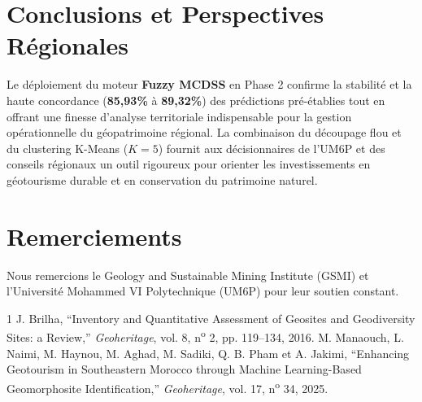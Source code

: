 \documentclass[11pt,twocolumn,a4paper]{article}
\begin{document}
\section{Conclusions et Perspectives Régionales}
Le déploiement du moteur \textbf{Fuzzy MCDSS} en Phase 2 confirme la stabilité et la haute concordance (\textbf{85,93\%} à \textbf{89,32\%}) des prédictions pré-établies tout en offrant une finesse d'analyse territoriale indispensable pour la gestion opérationnelle du géopatrimoine régional. La combinaison du découpage flou et du clustering K-Means ($K=5$) fournit aux décisionnaires de l'UM6P et des conseils régionaux un outil rigoureux pour orienter les investissements en géotourisme durable et en conservation du patrimoine naturel.

\section*{Remerciements}
Nous remercions le Geology and Sustainable Mining Institute (GSMI) et l'Université Mohammed VI Polytechnique (UM6P) pour leur soutien constant.

\begin{thebibliography}{1}
J. Brilha, ``Inventory and Quantitative Assessment of Geosites and Geodiversity Sites: a Review,'' \emph{Geoheritage}, vol. 8, n\textsuperscript{o} 2, pp. 119--134, 2016.
M. Manaouch, L. Naimi, M. Haynou, M. Aghad, M. Sadiki, Q. B. Pham et A. Jakimi, ``Enhancing Geotourism in Southeastern Morocco through Machine Learning-Based Geomorphosite Identification,'' \emph{Geoheritage}, vol. 17, n\textsuperscript{o} 34, 2025.
\end{thebibliography}
\end{document}
